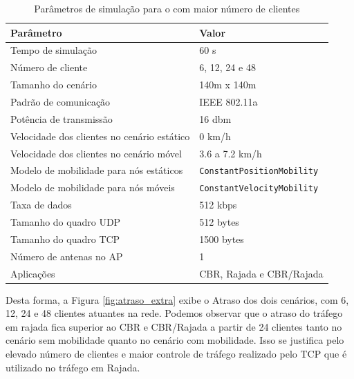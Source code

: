 \documentclass[12pt]{article}
\begin{document}
\begin{table}[h]
\centering
\caption{Parâmetros de simulação para o com maior número de clientes}
\vspace{0.1cm} %
\label{tab:parametros_extra}
\begin{tabular}{ll}
\hline
 \textbf{Parâmetro} & \textbf{Valor} \\
\hline
 Tempo de simulação & 60 s \\
 Número de cliente & 6, 12, 24 e 48 \\
 Tamanho do cenário & 140m x 140m \\
 Padrão de comunicação & IEEE 802.11a \\
 Potência de transmissão & 16 dbm\\
 Velocidade dos clientes no cenário estático & 0 km/h\\
Velocidade dos clientes no cenário móvel & 3.6 a 7.2 km/h \\
 Modelo de mobilidade para nós estáticos & \texttt{ConstantPositionMobility} \\
 Modelo de mobilidade para nós móveis & \texttt{ConstantVelocityMobility} \\
 Taxa de dados & 512 kbps \\
 Tamanho do quadro UDP & 512 bytes\\
 Tamanho do quadro TCP & 1500 bytes \\
 Número de antenas no AP & 1 \\
 Aplicações & CBR, Rajada e CBR/Rajada\\
\hline
\end{tabular}
\end{table}

Desta forma, a Figura \ref{fig:atraso_extra} exibe o Atraso dos dois cenários, com 6, 12, 24 e 48 clientes atuantes na rede. Podemos observar que o atraso do tráfego em rajada fica superior ao CBR e CBR/Rajada a partir de 24 clientes tanto no cenário sem mobilidade quanto no cenário com mobilidade. Isso se justifica pelo elevado número de clientes e maior controle de tráfego realizado pelo TCP que é utilizado no tráfego em Rajada.
\end{document}
